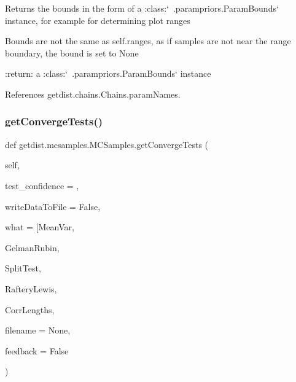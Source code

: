 \begin{DoxyVerb}Returns the bounds in the form of a :class:`~.parampriors.ParamBounds` instance, for example for determining plot ranges

Bounds are not  the same as self.ranges, as if samples are not near the range boundary, the bound is set to None

:return: a :class:`~.parampriors.ParamBounds` instance
\end{DoxyVerb}
 

References getdist.\+chains.\+Chains.\+param\+Names.

\mbox{\label{classgetdist_1_1mcsamples_1_1MCSamples_afafaf8166588387f41b032b9b8b61c0d}} 
\subsubsection{\texorpdfstring{get\+Converge\+Tests()}{getConvergeTests()}}
{\footnotesize\ttfamily def getdist.\+mcsamples.\+M\+C\+Samples.\+get\+Converge\+Tests (\begin{DoxyParamCaption}\item[{}]{self,  }\item[{}]{test\+\_\+confidence = {},  }\item[{}]{write\+Data\+To\+File = {\ttfamily False},  }\item[{}]{what = {\ttfamily \mbox{[}\textquotesingle{}MeanVar\textquotesingle{}},  }\item[{}]{Gelman\+Rubin,  }\item[{}]{Split\+Test,  }\item[{}]{Raftery\+Lewis,  }\item[{}]{Corr\+Lengths,  }\item[{}]{filename = {\ttfamily None},  }\item[{}]{feedback = {\ttfamily False} }\end{DoxyParamCaption})}

